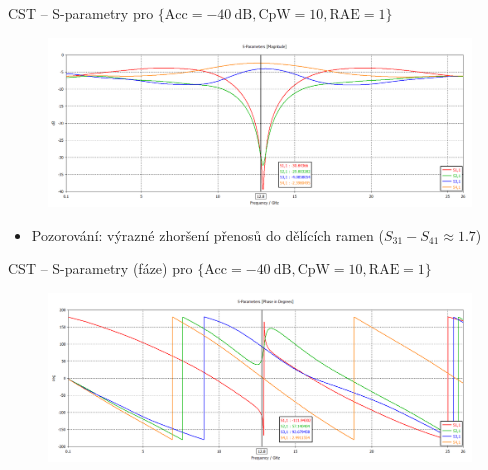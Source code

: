 \documentclass[aspectratio=169, 11pt, hyperref={unicode}]{beamer}
\begin{document}
\begin{frame}{CST -- S-parametry pro $\{\text{Acc} = -40\ \text{dB}, \text{CpW} = 10, \text{RAE} = 1\}$}
	\label{sn:s-parameters_1-rae}%
	\begin{figure}[!ht]
		\centering
		\includegraphics[width=.8\textwidth]{src/CST_S-Parameters_40dB_10-cpw_1-cntm.png}
	\end{figure}
	\begin{itemize}
		\item Pozorování: výrazné zhoršení přenosů do dělících ramen ($S_{31}-S_{41} \approx 1.7$)
	\end{itemize}
\end{frame}
\begin{frame}{CST -- S-parametry (fáze) pro $\{\text{Acc} = -40\ \text{dB}, \text{CpW} = 10, \text{RAE} = 1\}$}
    \begin{figure}[!ht]
        \centering
        \includegraphics[width=.8\textwidth]{src/CST_S-Parameters_phase_40dB_10-cpw_1-cntm.png}
    \end{figure}
\end{frame}
\end{document}
